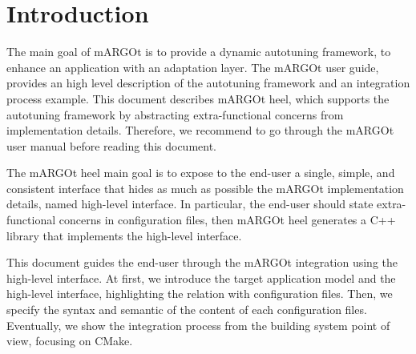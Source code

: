 \section{Introduction}


The main goal of mARGOt is to provide a dynamic autotuning framework, to enhance an application with an adaptation layer.
The mARGOt user guide, provides an high level description of the autotuning framework and an integration process example.
This document describes mARGOt heel, which supports the autotuning framework by abstracting extra-functional concerns from implementation details.
Therefore, we recommend to go through the mARGOt user manual before reading this document.

The mARGOt heel main goal is to expose to the end-user a single, simple, and consistent interface that hides as much as possible the mARGOt implementation details, named high-level interface.
In particular, the end-user should state extra-functional concerns in configuration files, then mARGOt heel generates a C++ library that implements the high-level interface.

This document guides the end-user through the mARGOt integration using the high-level interface.
At first, we introduce the target application model and the high-level interface, highlighting the relation with configuration files.
Then, we specify the syntax and semantic of the content of each configuration files.
Eventually, we show the integration process from the building system point of view, focusing on CMake.

